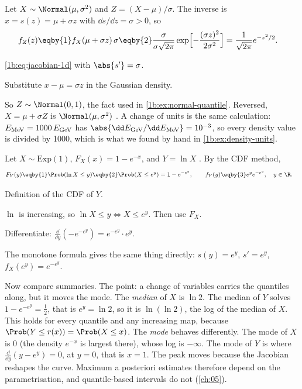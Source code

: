\label{1b:ex:standardise}
Let $X\sim\Normal(\mu,\sigma^2)$ and $Z=(X-\mu)/\sigma$. The inverse is
$x=s(z)=\mu+\sigma z$ with $\dd s/\dd z=\sigma>0$, so
\begin{align*}
  f_Z(z)
  &\eqby{1} f_X(\mu+\sigma z)\,\sigma
   \eqby{2} \frac{\sigma}{\sigma\sqrt{2\pi}}\exp\Bigl[-\frac{(\sigma z)^2}{2\sigma^2}\Bigr]
   = \frac{1}{\sqrt{2\pi}}e^{-z^2/2}.
\end{align*}
\begin{explain}
  \item \eqref{1b:eq:jacobian-1d} with $\abs{s'}=\sigma$.
  \item Substitute $x-\mu=\sigma z$ in the Gaussian density.
\end{explain}
So $Z\sim\Normal(0,1)$, the fact used in \cref{1b:ex:normal-quantile}.
Reversed, $X=\mu+\sigma Z$ is $\Normal(\mu,\sigma^2)$ . A
change of units is the same calculation: $E_{\rm MeV}=1000\,E_{\rm GeV}$ has
$\abs{\dd E_{\rm GeV}/\dd E_{\rm MeV}}=10^{-3}$, so every density value is
divided by 1000, which is what we found by hand in
\cref{1b:ex:density-units}.

\label{1b:ex:log-exp}
Let $X\sim\text{Exp}(1)$, $F_X(x)=1-e^{-x}$, and $Y=\ln X$
. By the CDF method,
\begin{align*}
  F_Y(y)
  &\eqby{1} \Prob(\ln X\le y)
   \eqby{2} \Prob(X\le e^y)
   = 1-e^{-e^y},
  \qquad
  f_Y(y)\eqby{3} e^ye^{-e^y},\quad y\in\R .
\end{align*}
\begin{explain}
  \item Definition of the CDF of $Y$.
  \item $\ln$ is increasing, so $\ln X\le y\iff X\le e^y$. Then use $F_X$.
  \item Differentiate: $\frac{\dd}{\dd y}(-e^{-e^y})=e^{-e^y}\cdot e^y$.
\end{explain}
The monotone formula gives the same thing directly:
$s(y)=e^y$, $s'=e^y$, $f_X(e^y)=e^{-e^y}$.

Now compare summaries. The point: a change of variables carries the
quantiles along, but it moves the mode. The \emph{median} of $X$ is $\ln2$.
The median of $Y$ solves $1-e^{-e^y}=\tfrac12$, that is $e^y=\ln2$, so it is
$\ln(\ln2)$, the log of the median of $X$. This holds for every quantile and
any increasing map, because $\Prob(Y\le r(x))=\Prob(X\le x)$. The
\emph{mode} behaves differently. The mode of $X$ is 0 (the density $e^{-x}$ is
largest there), whose log is $-\infty$. The mode of $Y$ is where
$\frac{\dd}{\dd y}(y-e^y)=0$, at $y=0$, that is $x=1$. The peak moves because
the Jacobian reshapes the curve. Maximum a posteriori estimates
therefore depend on the parametrisation, and quantile-based intervals do not
(\cref{ch:05}).

